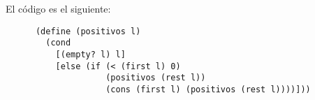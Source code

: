 \documentclass[answers]{exam}
\begin{document}
\begin{questions}
  \begin{solution}
      El código es el siguiente:
      \begin{verbatim}
      (define (positivos l)
        (cond
          [(empty? l) l]
          [else (if (< (first l) 0)
                    (positivos (rest l))
                    (cons (first l) (positivos (rest l))))]))
      \end{verbatim}
    \end{solution}
\end{questions}
\end{document}
